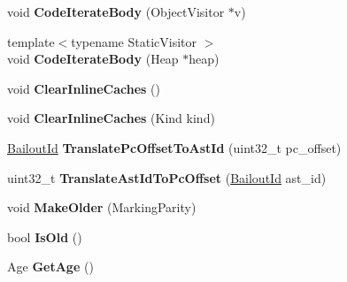 \begin{DoxyCompactItemize}
\item 
\hypertarget{classv8_1_1internal_1_1_code_a0dc23e278f512ff503c5633ace5ff30f}{}void {\bfseries Code\+Iterate\+Body} (Object\+Visitor $\ast$v)\label{classv8_1_1internal_1_1_code_a0dc23e278f512ff503c5633ace5ff30f}

\item 
\hypertarget{classv8_1_1internal_1_1_code_ae0a47e1956edc2a57570b6c5b1468e7e}{}{\footnotesize template$<$typename Static\+Visitor $>$ }\\void {\bfseries Code\+Iterate\+Body} (Heap $\ast$heap)\label{classv8_1_1internal_1_1_code_ae0a47e1956edc2a57570b6c5b1468e7e}

\item 
\hypertarget{classv8_1_1internal_1_1_code_aaf76a2343d83049d637d9d5915321cfa}{}void {\bfseries Clear\+Inline\+Caches} ()\label{classv8_1_1internal_1_1_code_aaf76a2343d83049d637d9d5915321cfa}

\item 
\hypertarget{classv8_1_1internal_1_1_code_ac438877d9af4ad22e98d1ce71fdc690a}{}void {\bfseries Clear\+Inline\+Caches} (Kind kind)\label{classv8_1_1internal_1_1_code_ac438877d9af4ad22e98d1ce71fdc690a}

\item 
\hypertarget{classv8_1_1internal_1_1_code_a346509df67531778e571d32b031a687f}{}\hyperlink{classv8_1_1internal_1_1_bailout_id}{Bailout\+Id} {\bfseries Translate\+Pc\+Offset\+To\+Ast\+Id} (uint32\+\_\+t pc\+\_\+offset)\label{classv8_1_1internal_1_1_code_a346509df67531778e571d32b031a687f}

\item 
\hypertarget{classv8_1_1internal_1_1_code_a100bbeaf8fcf8e8608d20ce2b364ad2e}{}uint32\+\_\+t {\bfseries Translate\+Ast\+Id\+To\+Pc\+Offset} (\hyperlink{classv8_1_1internal_1_1_bailout_id}{Bailout\+Id} ast\+\_\+id)\label{classv8_1_1internal_1_1_code_a100bbeaf8fcf8e8608d20ce2b364ad2e}

\item 
\hypertarget{classv8_1_1internal_1_1_code_ad2d4b186e030ab198fff770927e8b9e4}{}void {\bfseries Make\+Older} (Marking\+Parity)\label{classv8_1_1internal_1_1_code_ad2d4b186e030ab198fff770927e8b9e4}

\item 
\hypertarget{classv8_1_1internal_1_1_code_a296aa0b99e4fc0d279fbd4a5a78f63d7}{}bool {\bfseries Is\+Old} ()\label{classv8_1_1internal_1_1_code_a296aa0b99e4fc0d279fbd4a5a78f63d7}

\item 
\hypertarget{classv8_1_1internal_1_1_code_ab94cecb2c3cd1b3de780ea9c8d2d0606}{}Age {\bfseries Get\+Age} ()\label{classv8_1_1internal_1_1_code_ab94cecb2c3cd1b3de780ea9c8d2d0606}


\end{DoxyCompactItemize}
